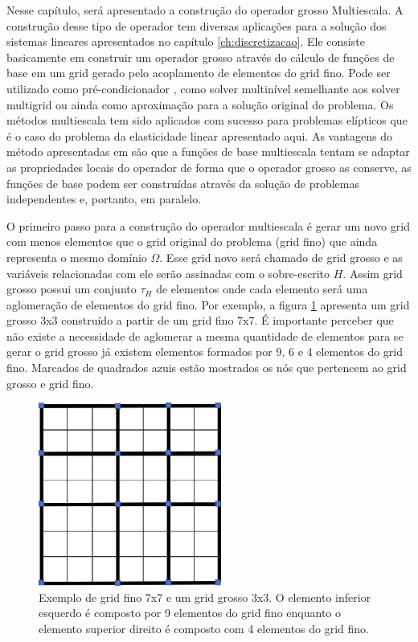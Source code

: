 
Nesse capítulo, será apresentado a construção do operador grosso Multiescala. A construção desse tipo de operador tem diversas aplicações para a solução dos sistemas lineares apresentados no capítulo \ref{ch:discretizacao}. Ele consiste basicamente em construir um operador grosso através do cálculo de funções de base em um grid gerado pelo acoplamento de elementos do grid fino. Pode ser utilizado como pré-condicionador \cite{casteletto}, como solver multinível semelhante aos solver multigrid ou ainda como aproximação para a solução original do problema. Os métodos multiescala tem sido aplicados com sucesso para problemas elípticos que é o caso do problema da elasticidade linear apresentado aqui. As vantagens do método apresentadas em \cite{thomashou} são que a funções de base multiescala tentam se adaptar as propriedades locais do operador de forma que o operador grosso as conserve, as funções de base podem ser construídas através da solução de problemas independentes e, portanto, em paralelo.

O primeiro passo para a construção do operador multiescala é gerar um novo grid com menos elementos que o grid original do problema (grid fino) que ainda representa o mesmo domínio $\Omega$. Esse grid novo será chamado de grid grosso e as variáveis relacionadas com ele serão assinadas com o sobre-escrito $H$. 
Assim grid grosso possui um conjunto $\tau_H$ de elementos onde cada elemento será uma aglomeração de elementos do grid fino. Por exemplo, a figura \ref{fig:gridgrosso} apresenta um grid grosso 3x3 construído a partir de um grid fino 7x7. É importante perceber que não existe a necessidade de aglomerar a mesma quantidade de elementos para se gerar o grid grosso já existem elementos formados por 9, 6 e 4 elementos do grid fino. Marcados de quadrados azuis estão mostrados os nós que pertencem ao grid grosso e grid fino.

\begin{figure}[!htbp]
\centering
\includegraphics[width=6cm]{chap06/figs/grosso.png}
\caption{Exemplo de grid fino 7x7 e um grid grosso 3x3. O elemento inferior esquerdo é composto por 9 elementos do grid fino enquanto o elemento superior direito é composto com 4 elementos do grid fino.}
\label{fig:gridgrosso}

\end{figure}



